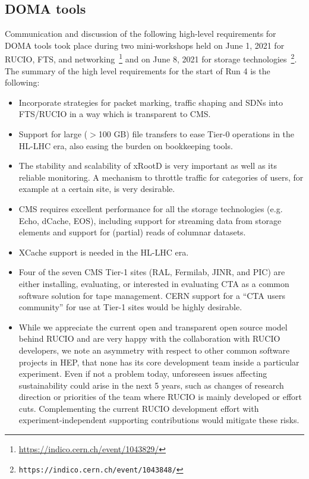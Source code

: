 \subsection{DOMA tools}
Communication and discussion of the following high-level requirements for DOMA tools took place during two mini-workshops held on June 1, 2021 for RUCIO, FTS, and networking~\footnote{\url{https://indico.cern.ch/event/1043829/}} and on June 8, 2021 for storage technologies~\footnote{\tt{https://indico.cern.ch/event/1043848/}}.
The summary of the high level requirements for the start of Run 4 is the following:
\begin{itemize}
    \item Incorporate strategies for packet marking, traffic shaping and SDNs into FTS/RUCIO in a way which is transparent to CMS.
    \item Support for large ($>$100 GB) file transfers to ease Tier-0 operations in the HL-LHC era, also easing the burden on bookkeeping tools. 
    \item The stability and scalability of xRootD is very important as well as its reliable monitoring. A mechanism to throttle traffic for categories of users, for example at a certain site, is very desirable.
    \item CMS requires excellent performance for all the storage technologies (e.g. Echo, dCache, EOS), including support for streaming data from storage elements and support for (partial) reads of columnar datasets.
    \item XCache support is needed in the HL-LHC era.
    \item Four of the seven CMS Tier-1 sites (RAL, Fermilab, JINR, and PIC) are either installing, evaluating, or interested in evaluating CTA as a common software solution for tape management. CERN support for a ``CTA users community'' for use at Tier-1 sites would be highly desirable.
    \item While we appreciate the current open and transparent open source model behind RUCIO and are very happy with the collaboration with RUCIO developers, we note an asymmetry with respect to other common software projects in HEP, that none has its core development team inside a particular experiment. Even if not a problem today, unforeseen issues affecting sustainability could arise in the next 5 years, such as changes of research direction or priorities of the team where RUCIO is mainly developed or effort cuts. Complementing the current RUCIO development effort with experiment-independent supporting contributions would mitigate these risks.
\end{itemize}

